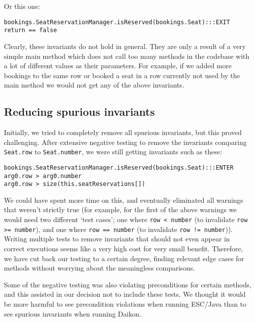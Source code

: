 \documentclass[11pt]{article}
\begin{document}
Or this one:

\noindent
\begin{verbatim}
bookings.SeatReservationManager.isReserved(bookings.Seat):::EXIT
return == false
\end{verbatim}

Clearly, these invariants do not hold in general. They are only a result of a very simple main method which does not call too many methods in the codebase with a lot of different values as their parameters. For example, if we added more bookings to the same row or booked a seat in a row currently not used by the main method we would not get any of the above invariants.

\subsection{Reducing spurious invariants}

Initially, we tried to completely remove all spurious invariants, but this proved challenging. After extensive negative testing to remove the invariants comparing \verb|Seat.row| to \verb|Seat.number|, we were still getting invariants such as these:

\noindent
\begin{verbatim}
bookings.SeatReservationManager.isReserved(bookings.Seat):::ENTER
arg0.row > arg0.number
arg0.row > size(this.seatReservations[])
\end{verbatim}

We could have spent more time on this, and eventually eliminated all warnings that weren't strictly true (for example, for the first of the above warnings we would need two different `test cases'; one where \verb|row < number| (to invalidate \verb|row >= number|), and one where \verb|row == number| (to invalidate \verb|row != number|)). Writing multiple tests to remove invariants that should not even appear in correct executions seems like a very high cost for very small benefit. Therefore, we have cut back our testing to a certain degree, finding relevant edge cases for methods without worrying about the meaningless comparisons.

Some of the negative testing was also violating preconditions for certain methods, and this assisted in our decision not to include these tests. We thought it would be more harmful to see precondition violations when running ESC/Java than to see spurious invariants when running Daikon.
\end{document}
